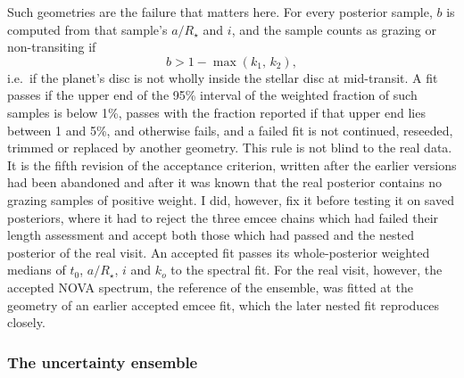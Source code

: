 Such geometries are the failure that matters here. For every posterior
sample, $b$ is computed from that sample's $a/R_\star$ and $i$, and the
sample counts as grazing or non-transiting if
\begin{equation}
 b > 1-\max(k_1,\,k_2),
 \label{eq:grazing}
\end{equation}
i.e.\ if the planet's disc is not wholly inside the stellar disc at
mid-transit. A fit passes if the upper end of the 95\% interval of the
weighted fraction of such samples is below 1\%, passes with the fraction
reported if that upper end lies between 1 and 5\%, and otherwise fails, and a failed fit
is not continued, reseeded, trimmed or replaced by another geometry. This
rule is not blind to the real data. It is the fifth revision of the
acceptance criterion, written after the earlier versions had been abandoned
and after it was known that the real posterior contains no grazing samples of
positive weight. I did, however, fix it before testing it on saved
posteriors, where it had to reject the three emcee chains which had failed
their length assessment and accept both those which had passed and the nested
posterior of the real visit. An accepted fit passes its whole-posterior weighted medians of
$t_0$, $a/R_\star$, $i$ and $k_o$ to the spectral fit. For the real visit,
however, the accepted NOVA spectrum, the reference of the ensemble, was
fitted at the geometry of an earlier accepted emcee fit, which the later
nested fit reproduces closely.

\subsubsection{The uncertainty ensemble}
\label{sec:ensemble}

